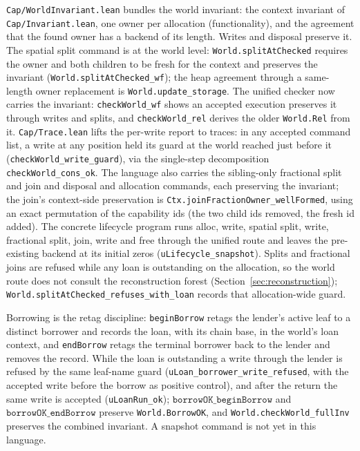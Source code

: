 \documentclass[10pt,a4paper]{article}
\newcommand{\file}[1]{\texttt{\small #1}}
\begin{document}
\file{Cap/WorldInvariant.lean} bundles the world invariant: the context invariant
of \file{Cap/Invariant.lean}, one owner per allocation (functionality), and the
agreement that the found owner has a backend of its length. Writes and disposal
preserve it. The spatial split command is at the world level:
\texttt{World.splitAtChecked} requires the owner and both children to be fresh
for the context and preserves the invariant (\texttt{World.splitAtChecked\_wf});
the heap agreement through a same-length owner replacement is
\texttt{World.update\_storage}. The unified checker now carries the invariant:
\texttt{checkWorld\_wf} shows an accepted execution preserves it through writes
and splits, and \texttt{checkWorld\_rel} derives the older \texttt{World.Rel}
from it. \file{Cap/Trace.lean} lifts the per-write report to traces: in any
accepted command list, a write at any position held its guard at the world
reached just before it (\texttt{checkWorld\_write\_guard}), via the single-step
decomposition \texttt{checkWorld\_cons\_ok}. The language also carries the sibling-only fractional split and join and disposal
and allocation commands, each preserving the invariant; the join's context-side
preservation is \texttt{Ctx.joinFractionOwner\_wellFormed}, using an exact
permutation of the capability ids (the two child ids removed, the fresh id added).
The concrete lifecycle program runs alloc, write, spatial split, write, fractional
split, join, write and free through the unified route and leaves the pre-existing
backend at its initial zeros (\texttt{uLifecycle\_snapshot}).
Splits and fractional joins are refused while any loan is outstanding on the
allocation, so the world route does not consult the reconstruction forest
(Section~\ref{sec:reconstruction}); \texttt{World.splitAtChecked\_refuses\_with\_loan}
records that allocation-wide guard.

Borrowing is the retag discipline: \texttt{beginBorrow} retags the lender's
active leaf to a distinct borrower and records the loan, with its chain base, in
the world's loan context, and \texttt{endBorrow} retags the terminal borrower
back to the lender and removes the record. While the loan is outstanding a write
through the lender is refused by the same leaf-name guard
(\texttt{uLoan\_borrower\_write\_refused}, with the accepted write before the
borrow as positive control), and after the return the same write is accepted
(\texttt{uLoanRun\_ok}); \(\texttt{borrowOK\_beginBorrow}\) and
\(\texttt{borrowOK\_endBorrow}\) preserve \texttt{World.BorrowOK}, and
\texttt{World.checkWorld\_fullInv} preserves the combined invariant. A snapshot
command is not yet in this language.
\end{document}
